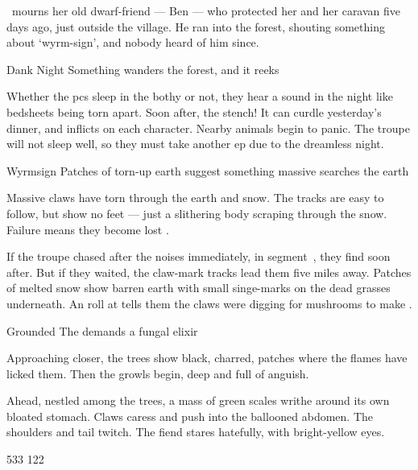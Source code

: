 \documentclass[10pt,twoside]{book}
\begin{document}
\currentName\ mourns her old dwarf-friend --- Ben --- who protected her and her caravan five days ago, just outside the \gls{village}.
He ran into the forest, shouting something about `wyrm-sign', and nobody heard of him since.

{Dank Night}%
{Something wanders the forest, and it reeks}%
\label{dankNight}

Whether the \glspl{pc} sleep in the \gls{bothy} or not, they hear a sound in the night like bedsheets being torn apart.
Soon after, the stench!
It can curdle yesterday's dinner, and inflicts  on each character.
Nearby animals begin to panic.
The troupe will not sleep well, so they must take another \gls{ep} due to the dreamless night.

{Wyrmsign}%
{Patches of torn-up earth suggest something massive searches the earth}%

Massive claws have torn through the earth
\ifnum{}
  and snow.
  The tracks are easy to follow, but show no feet --- just a slithering body scraping through the snow.
\else
  Failure means they become lost%
\fi.

If the troupe chased after the noises immediately, in \gls{segment}~, they find soon after.
But if they waited, the claw-mark tracks lead them five miles away.
\ifnum{}
  Patches of melted snow show barren earth with small singe-marks on the dead grasses underneath.
\else
  An  roll at \tn[12] tells them the claws were digging for mushrooms to make .
\fi

{Grounded}%
{The  demands a fungal \gls{elixir}}%
\label{irregularDragon}

Approaching closer, the trees show black, charred, patches where the flames have licked them.
Then the growls begin, deep and full of anguish.

\begin{boxtext}
  Ahead, nestled among the trees, a mass of green scales writhe around its own bloated stomach.
  Claws caress and push into the ballooned abdomen.
  The shoulders and tail twitch.
  The \gls{fiend} stares hatefully, with bright-yellow eyes.
\end{boxtext}

%
  {{5}{3}{3}}%
  {{1}{2}{2}}%
  {
  }%
  {\lucky}%
  {}%
  {\flight \quadruped {}}%
\end{document}
